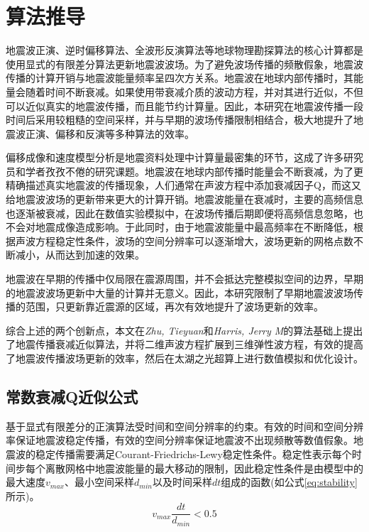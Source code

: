 \documentclass[degree=doctor]{thuthesis}
\begin{document}
\section{算法推导}

地震波正演、逆时偏移算法、全波形反演算法等地球物理勘探算法的核心计算都是使用显式的有限差分算法更新地震波波场。为了避免波场传播的频散假象，地震波传播的计算开销与地震波能量频率呈四次方关系。地震波在地球内部传播时，其能量会随着时间不断衰减。如果使用带衰减介质的波动方程，并对其进行近似，不但可以近似真实的地震波传播，而且能节约计算量。因此，本研究在地震波传播一段时间后采用较粗糙的空间采样，并与早期的波场传播限制相结合，极大地提升了地震波正演、偏移和反演等多种算法的效率。

偏移成像和速度模型分析是地震资料处理中计算量最密集的环节，这成了许多研究员和学者孜孜不倦的研究课题\cite{bednar2002limited,stork2013eliminating}。地震波在地球内部传播时能量会不断衰减，为了更精确描述真实地震波的传播现象，人们通常在声波方程中添加衰减因子Q，而这又给地震波波场的更新带来更大的计算开销。地震波能量在衰减时，主要的高频信息也逐渐被衰减，因此在数值实验模拟中，在波场传播后期即便将高频信息忽略，也不会对地震成像造成影响。于此同时，由于地震波能量中最高频率在不断降低，根据声波方程稳定性条件，波场的空间分辨率可以逐渐增大，波场更新的网格点数不断减小，从而达到加速的效果。

地震波在早期的传播中仅局限在震源周围，并不会抵达完整模拟空间的边界，早期的地震波波场更新中大量的计算并无意义。因此，本研究限制了早期地震波波场传播的范围，只更新靠近震源的区域，再次有效地提升了波场更新的效率。

综合上述的两个创新点，本文在\emph{Zhu, Tieyuan}和\emph{Harris, Jerry M}\cite{zhu2014modeling}的算法基础上提出了地震传播衰减近似算法，并将二维声波方程扩展到三维弹性波方程，有效的提高了地震波传播波场更新的效率，然后在太湖之光超算上进行数值模拟和优化设计。

\subsection{常数衰减Q近似公式}

基于显式有限差分的正演算法受时间和空间分辨率的约束。有效的时间和空间分辨率保证地震波稳定传播，有效的空间分辨率保证地震波不出现频散等数值假象。地震波的稳定传播需要满足Courant-Friedrichs-Lewy稳定性条件\cite{courant1967partial}。稳定性表示每个时间步每个离散网格中地震波能量的最大移动的限制，因此稳定性条件是由模型中的最大速度$v_{max}$、最小空间采样$d_{min}$以及时间采样$dt$组成的函数(如公式\ref{eq:stability}所示)。
\begin{equation}
  v_{max} \frac{dt}{d_{min}} < 0.5
  \label{eq:stability}
\end{equation}
\end{document}
